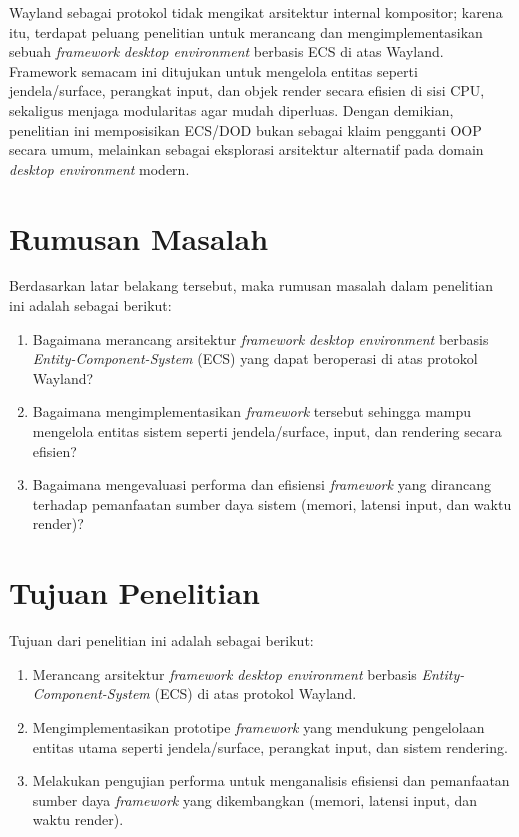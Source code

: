 Wayland sebagai protokol tidak mengikat arsitektur internal kompositor; karena itu, terdapat peluang penelitian untuk merancang dan mengimplementasikan sebuah \textit{framework} \textit{desktop environment} berbasis ECS di atas Wayland. Framework semacam ini ditujukan untuk mengelola entitas seperti jendela/surface, perangkat input, dan objek render secara efisien di sisi CPU, sekaligus menjaga modularitas agar mudah diperluas. Dengan demikian, penelitian ini memposisikan ECS/DOD bukan sebagai klaim pengganti OOP secara umum, melainkan sebagai eksplorasi arsitektur alternatif pada domain \textit{desktop environment} modern. \par

\section{Rumusan Masalah} \label{I.Rumusan Masalah}
Berdasarkan latar belakang tersebut, maka rumusan masalah dalam penelitian ini adalah sebagai berikut: \par
\begin{enumerate}[noitemsep]
    \item Bagaimana merancang arsitektur \textit{framework} \textit{desktop environment} berbasis \textit{Entity-Component-System} (ECS) yang dapat beroperasi di atas protokol Wayland? 
    \item Bagaimana mengimplementasikan \textit{framework} tersebut sehingga mampu mengelola entitas sistem seperti jendela/surface, input, dan rendering secara efisien? 
    \item Bagaimana mengevaluasi performa dan efisiensi \textit{framework} yang dirancang terhadap pemanfaatan sumber daya sistem (memori, latensi input, dan waktu render)? 
\end{enumerate}
\par

\section{Tujuan Penelitian} \label{I.Tujuan}
Tujuan dari penelitian ini adalah sebagai berikut: \par
\begin{enumerate}[noitemsep]
    \item Merancang arsitektur \textit{framework} \textit{desktop environment} berbasis \textit{Entity-Component-System} (ECS) di atas protokol Wayland. 
    \item Mengimplementasikan prototipe \textit{framework} yang mendukung pengelolaan entitas utama seperti jendela/surface, perangkat input, dan sistem rendering. 
    \item Melakukan pengujian performa untuk menganalisis efisiensi dan pemanfaatan sumber daya \textit{framework} yang dikembangkan (memori, latensi input, dan waktu render). 
\end{enumerate}
\par

